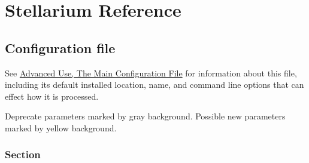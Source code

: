 
\chapter{Stellarium Reference}

\section{Configuration file}
See \href{Advanced_Use\#The_Main_Configuration_File}{Advanced Use, The
Main Configuration File} for information about this file, including its
default installed location, name, and command line options that can
effect how it is processed.

Deprecate parameters marked by gray background. Possible new parameters
marked by yellow background.

\subsection{Section }\label{section-astro}

